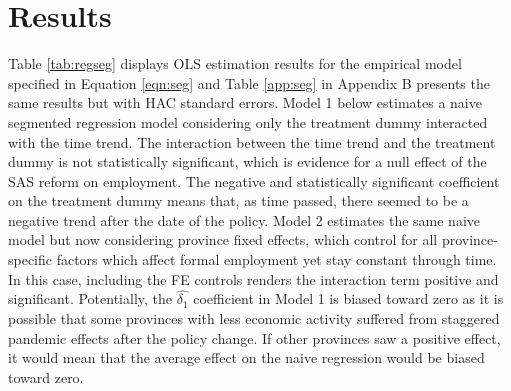 \documentclass[11pt,a4paper]{article}\usepackage[]{graphicx}\usepackage[]{xcolor}
\begin{document}
\section{Results}
Table \ref{tab:regseg} displays OLS estimation results for the empirical model specified in Equation \ref{eqn:seg} and Table \ref{app:seg} in Appendix B presents the same results but with HAC standard errors. Model 1 below estimates a naive segmented regression model considering only the treatment dummy interacted with the time trend. The interaction between the time trend and the treatment dummy is not statistically significant, which is evidence for a null effect of the SAS reform on employment. The negative and statistically significant coefficient on the treatment dummy means that, as time passed, there seemed to be a negative trend after the date of the policy. Model 2 estimates the same naive model but now considering province fixed effects, which control for all province-specific factors which affect formal employment yet stay constant through time. In this case, including the FE controls renders the interaction term positive and significant. Potentially, the $\hat{\delta_1}$ coefficient in Model 1 is biased toward zero as it is possible that some provinces with less economic activity suffered from staggered pandemic effects after the policy change. If other provinces saw a positive effect, it would mean that the average effect on the naive regression would be biased toward zero. 
\end{document}
